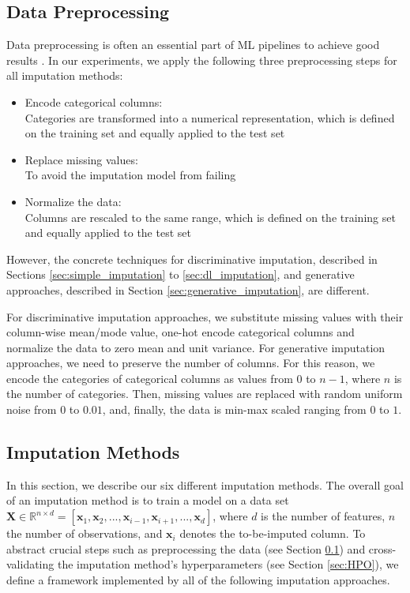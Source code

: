 \documentclass[utf8]{frontiersSCNS} %
\renewcommand{\vec}[1]{\mathbf{#1}}
\newcommand{\R}{\ensuremath{\mathds{R}}}
\begin{document}
\subsection{Data Preprocessing}
\label{sec:preprocessing}
%
Data preprocessing is often an essential part of ML pipelines to achieve good results \citep{Sculley2015}. In our experiments, we apply the following three preprocessing steps for all imputation methods:
%
\begin{itemize}
	\item Encode categorical columns: \\
	Categories are transformed into a numerical representation, which is defined on the training set and equally applied to the test set

	\item Replace missing values: \\
	To avoid the imputation model from failing

	\item Normalize the data: \\
	Columns are rescaled to the same range, which is defined on the training set and equally applied to the test set
\end{itemize}
%
However, the concrete techniques for discriminative imputation, described in Sections \ref{sec:simple_imputation} to \ref{sec:dl_imputation}, and generative approaches, described in Section \ref{sec:generative_imputation}, are different.

For discriminative imputation approaches, we substitute missing values with their column-wise mean/mode value, one-hot encode categorical columns and normalize the data to zero mean and unit variance.
For generative imputation approaches, we need to preserve the number of columns. For this reason, we encode the categories of categorical columns as values from $0$ to $n-1$, where $n$ is the number of categories. Then, missing values are replaced with random uniform noise from $0$ to $0.01$, and, finally, the data is min-max scaled ranging from $0$ to $1$.

\subsection{Imputation Methods}
\label{sec:methods:impuation}
%
In this section, we describe our six different imputation methods. The overall goal of an imputation method is to train a model on a data set $\vec{X}\in\R^{n\times d} = [\vec{x}_1, \vec{x}_2, ..., \vec{x}_{i-1}, \vec{x}_{i+1}, ..., \vec{x}_d]$, where $d$ is the number of features, $n$ the number of observations, and $\vec{x}_i$ denotes the to-be-imputed column.
To abstract crucial steps such as preprocessing the data (see Section \ref{sec:preprocessing}) and cross-validating the imputation method's hyperparameters (see Section \ref{sec:HPO}), we define a framework implemented by all of the following imputation approaches.
\end{document}
